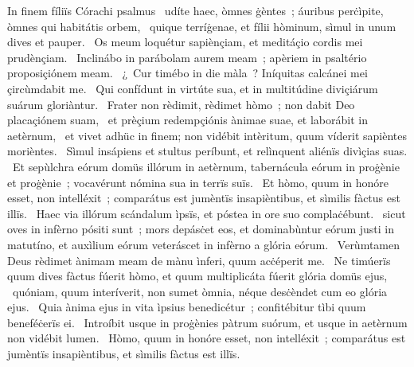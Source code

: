 { In finem fíliïs Córachi psalmus}
{%
~udíte haec, òmnes ġèntes~; áuribus perċìpite, òmnes qui habitátis orbem, 
~quique terríġenae, et fílii hòminum, sìmul in unum dives et pauper. 
~Os meum loquétur sapiènçiam, et meditáçio cordis mei prudènçiam. 
~Inclinábo in parábolam aurem meam~; apèriem in psaltério proposiçiónem meam. 
~¿~Cur timébo in die màla~? Iníquitas calcánei mei çircùmdabit me. 
~Qui confídunt in virtúte sua, et in multitúdine diviçiárum suárum gloriàntur. 
~Frater non rèdimit, rèdimet hòmo~; non dabit Deo placaçiónem suam, 
~et prèçium redempçiónis ànimae suae, et laborábit in aetèrnum, 
~et vivet adhüc in finem; non vidébit intèritum, quum víderit sapièntes morièntes. 
~Sìmul insápiens et stultus períbunt, et relìnquent aliénïs divìçias suas. 
~Et sepùlchra eórum domüs illórum in aetèrnum, tabernácula eórum in proġènie et proġènie~; vocavérunt nómina sua in terrïs suïs. 
~Et hòmo, quum in honóre esset, non intelléxit~; comparátus est jumèntïs insapièntibus, et sìmilis fàctus est illïs. 
~Haec via illórum scándalum ìpsïs, et póstea in ore suo complaċébunt. 
~sicut oves in infèrno pósiti sunt~; mors depásċet eos, et dominabùntur eórum justi in matutíno, et auxìlium eórum veteráscet in infèrno a glória eórum. 
~Verùmtamen Deus rèdimet ànimam meam de mànu ìnferi, quum acċéperit me. 
~Ne timúerïs quum dives fàctus fúerit hòmo, et quum multiplicáta fúerit glória domüs ejus, 
~quóniam, quum interíverit, non sumet òmnia, néque desċèndet cum eo glória ejus. 
~Quia ànima ejus in vita ìpsius benedicétur~; confitébitur tìbi quum beneféċerïs ei. 
~Introíbit usque in proġènies pàtrum suórum, et usque in aetèrnum non vidébit lumen. 
~Hòmo, quum in honóre esset, non intelléxit~; comparátus est jumèntïs insapièntibus, et sìmilis fàctus est illïs. 
}
